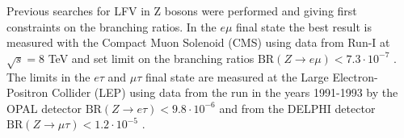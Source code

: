 Previous searches for \gls{LFV} in Z bosons were performed and giving first constraints on the branching ratios. In the $e\mu$ final state the best result is measured with the Compact Muon Solenoid (\gls{CMS}) using data from Run-I at $\sqrt{s} = 8$ TeV and set limit on the branching ratios $\text{BR}(Z\to e\mu) < 7.3\cdot 10^{-7}$ \cite{LFVEMU}. The limits in the $e\tau$ and $\mu\tau$ final state are measured at the Large Electron-Positron Collider (\gls{LEP}) \cite{LEP} using data from the run in the years 1991-1993 by the OPAL detector $\text{BR}(Z\to e\tau) < 9.8\cdot 10^{-6}$ \cite{LFVETAU} and from the DELPHI detector $\text{BR}(Z\to \mu\tau) < 1.2\cdot 10^{-5}$ \cite{LFVMUTAU}.
